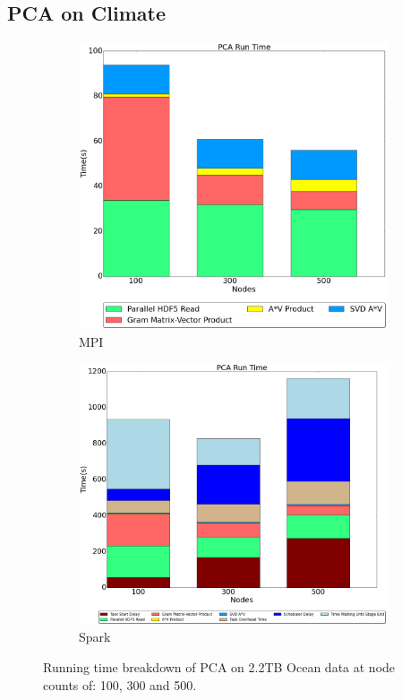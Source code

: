 \subsection{PCA on Climate}
\begin{figure}[th!]
\begin{subfigure}{.45\textwidth}
\includegraphics[width=\textwidth]{fig/mpi_pca.png}
\caption{MPI}
\label{fig:mpipca}
\end{subfigure}
\begin{subfigure}{.5\textwidth}
\includegraphics[width=\textwidth]{fig/spark_pca.png}
\caption{Spark}
\label{fig:sparkpca}
\end{subfigure}
\caption{Running time breakdown of PCA on 2.2TB Ocean data at node counts of: 100, 300 and 500.}
\label{fig:pcart}
\end{figure}

